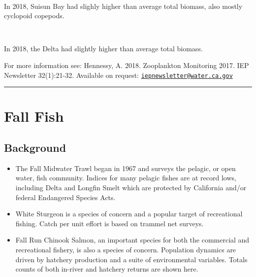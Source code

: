 \documentclass[
]{book}
\providecommand{\tightlist}{%
  \setlength{\itemsep}{0pt}\setlength{\parskip}{0pt}}
\begin{document}
\begin{panel-grid}
\begin{columns-nocenter}
\begin{column40}
~

\end{column40}

\begin{column800}

In 2018, Suisun Bay had slighly higher than average total biomass, also mostly cyclopoid copepods.

\end{column800}

\begin{column40}

~

\end{column40}

\begin{column800}

In 2018, the Delta had slightly higher than average total biomass.

\end{column800}

\end{columns-nocenter}

\end{panel-grid}

\begin{disclaimer}
For more information see: Hennessy, A. 2018. Zooplankton Monitoring
2017. IEP Newsletter 32(1):21-32. Available on request:
\href{mailto:iepnewsletter@water.ca.gov}{\nolinkurl{iepnewsletter@water.ca.gov}}
\end{disclaimer}

\begin{center}\rule{0.5\linewidth}{0.5pt}\end{center}

\hypertarget{fall-fish}{%
\section{Fall Fish}\label{fall-fish}}

\hypertarget{background-4}{%
\subsection{Background}\label{background-4}}

\begin{itemize}
\tightlist
\item
  The Fall Midwater Trawl began in 1967 and surveys the pelagic, or open water, fish community. Indices for many pelagic fishes are at record lows, including Delta and Longfin Smelt which are protected by California and/or federal Endangered Species Acts.
\item
  White Sturgeon is a species of concern and a popular target of recreational fishing. Catch per unit
  effort is based on trammel net surveys.
\item
  Fall Run Chinook Salmon, an important species for both the commercial and recreational fishery, is also a species of concern. Population dynamics are driven by hatchery production and a suite of environmental variables. Totals counts of both in-river and hatchery returns are shown here.
\end{itemize}
\end{document}
